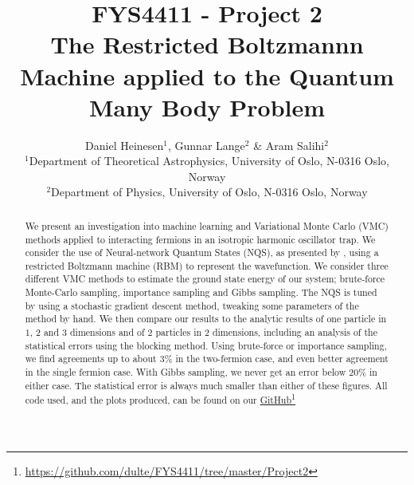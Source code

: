 \documentclass[a4paper, 10pt]{article}
\title{FYS4411 - Project 2\\
	The Restricted Boltzmannn Machine applied to the Quantum Many Body Problem}
\author{Daniel Heinesen$^1$, Gunnar Lange$^2$ \& Aram Salihi$^2$\\
	\small $^1$Department of Theoretical Astrophysics, University of Oslo, N-0316 Oslo, Norway\\
	\small $^2$Department of Physics, University of Oslo, N-0316 Oslo, Norway}
\begin{document}
	\maketitle
	\begin{abstract}
	\begin{center}
	We present an investigation into machine learning and Variational Monte Carlo (VMC) methods applied to interacting fermions in an isotropic harmonic oscillator trap. We consider the use of Neural-network Quantum States (NQS), as presented by \cite{Carleo602}, using a restricted Boltzmann machine (RBM) to represent the wavefunction. We consider three different VMC methods to estimate the ground state energy of our system; brute-force Monte-Carlo sampling, importance sampling and Gibbs sampling. The NQS is tuned by using a stochastic gradient descent method, tweaking some parameters of the method by hand. We then compare our results to the analytic results of one particle in $1$, $2$ and $3$ dimensions and of $2$ particles in $2$ dimensions, including an analysis of the statistical errors using the blocking method. Using brute-force or importance sampling, we find agreements up to about $3\%$ in the two-fermion case, and even better agreement in the single fermion case. With Gibbs sampling, we never get an error below $20\%$ in either case. The statistical error is always much smaller than either of these figures.
	 All code used, and the plots produced, can be found on our \href{https://github.com/dulte/FYS4411/tree/master/Project2}{GitHub}\footnote{\url{https://github.com/dulte/FYS4411/tree/master/Project2}}
\end{center}
	\end{abstract}
	\newpage
	\tableofcontents
	\newpage
\end{document}
